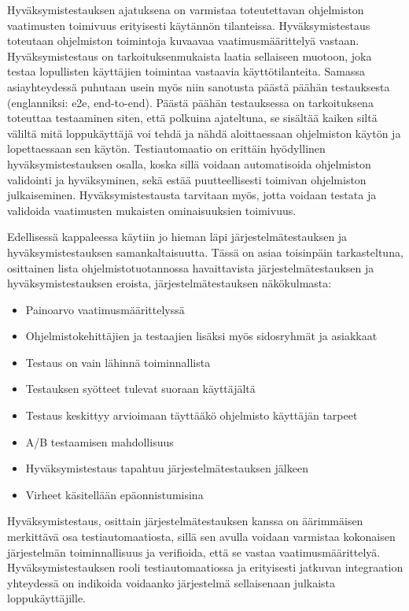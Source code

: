   Hyväksymistestauksen ajatuksena on varmistaa toteutettavan ohjelmiston vaatimusten toimivuus erityisesti käytännön tilanteissa.
  Hyväksymistestaus toteutaan ohjelmiston toimintoja kuvaavaa vaatimusmäärittelyä vastaan.
  Hyväksymistestaus on tarkoituksenmukaista laatia sellaiseen muotoon, joka testaa lopullisten käyttäjien toimintaa vastaavia käyttötilanteita.
  Samassa asiayhteydessä puhutaan usein myös niin sanotusta päästä päähän testauksesta (englanniksi: e2e, end-to-end).
  Päästä päähän testauksessa on tarkoituksena toteuttaa testaaminen siten, että polkuina ajateltuna, se sisältää kaiken siltä väliltä mitä loppukäyttäjä voi tehdä ja nähdä aloittaessaan ohjelmiston käytön ja lopettaessaan sen käytön.
  Testiautomaatio on erittäin hyödyllinen hyväksymistestauksen osalla, koska sillä voidaan automatisoida ohjelmiston validointi ja hyväksyminen, sekä estää puutteellisesti toimivan ohjelmiston julkaiseminen.
  Hyväksymistestausta tarvitaan myös, jotta voidaan testata ja validoida vaatimusten mukaisten ominaisuuksien toimivuus.

  Edellisessä kappaleessa käytiin jo hieman läpi järjestelmätestauksen ja hyväksymistestauksen samankaltaisuutta.
  Tässä on asiaa toisinpäin tarkasteltuna, osittainen lista ohjelmistotuotannossa havaittavista järjestelmätestauksen ja hyväksymistestauksen eroista, järjestelmätestauksen näkökulmasta:

  \begin{itemize}
    \item Painoarvo vaatimusmäärittelyssä
    \item Ohjelmistokehittäjien ja testaajien lisäksi myös sidosryhmät ja asiakkaat
    \item Testaus on vain lähinnä toiminnallista
    \item Testauksen syötteet tulevat suoraan käyttäjältä
    \item Testaus keskittyy arvioimaan täyttääkö ohjelmisto käyttäjän tarpeet
    \item A/B testaamisen mahdollisuus
    \item Hyväksymistestaus tapahtuu järjestelmätestauksen jälkeen
    \item Virheet käsitellään epäonnistumisina
  \end{itemize}

  Hyväksymistestaus, osittain järjestelmätestauksen kanssa on äärimmäisen merkittävä osa testiautomaatiosta, sillä sen avulla voidaan varmistaa kokonaisen järjestelmän toiminnallisuus ja verifioida, että se vastaa vaatimusmäärittelyä.
  Hyväksymistestauksen rooli testiautomaatiossa ja erityisesti jatkuvan integraation yhteydessä on indikoida voidaanko järjestelmä sellaisenaan julkaista loppukäyttäjille.

